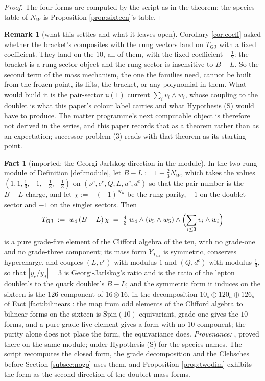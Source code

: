 \documentclass[11pt]{article}
\theoremstyle{definition}
\newtheorem{remark}[theorem]{Remark}
\newtheorem{fact}[theorem]{Fact}
\newcommand{\uu}{\mathfrak{u}}
\begin{document}
\begin{proof}
The four forms are computed by the script as in the theorem; the species table of $N_{W}$ is Proposition \ref{prop:sixteen}'s table.
\end{proof}

\begin{remark}[what this settles and what it leaves open]\label{rem:bracket}
Corollary \ref{cor:coeff} asked whether the bracket's composites with the rung vectors land on $T_{\mathrm{GJ}}$ with a fixed coefficient. They land on the $10$, all of them, with the fixed coefficient $-\tfrac12$: the bracket is a rung-sector object and the rung sector is insensitive to $B - L$. So the second term of the mass mechanism, the one the families need, cannot be built from the frozen point, its lifts, the bracket, or any polynomial in them. What would build it is the pair-sector $\uu(1)$ current $\sum_{i} v_{i} \wedge w_{i}$, whose coupling to the doublet is what this paper's colour label carries and what Hypothesis (S) would have to produce. The matter programme's next computable object is therefore not derived in the series, and this paper records that as a theorem rather than as an expectation; successor problem (3) reads with that theorem as its starting point.
\end{remark}

\begin{fact}[imported: the Georgi-Jarlskog direction in the module]\label{fact:gj}
In the two-rung module of Definition \ref{def:module}, let $B - L := 1 - \tfrac23 N_{W}$, which takes the values $(1, 1, \tfrac13, -1, -\tfrac13, -\tfrac13)$ on $(\nu^{c}, e^{c}, Q, L, u^{c}, d^{c})$ so that the pair number is the $B - L$ charge, and let $\chi := -(-1)^{N_{R}}$ be the rung parity, $+1$ on the doublet sector and $-1$ on the singlet sectors. Then
\[
T_{\mathrm{GJ}} \;:=\; w_{4}\,(B - L)\,\chi \;=\; \tfrac43\; w_{4}\wedge (v_{5}\wedge w_{5}) \wedge \Bigl(\sum_{i\le 3} v_{i}\wedge w_{i}\Bigr)
\]
is a pure grade-five element of the Clifford algebra of the ten, with no grade-one and no grade-three component; its mass form $Y_{T_{\mathrm{GJ}}}$ is symmetric, conserves hypercharge, and couples $(L, e^{c})$ with modulus $1$ and $(Q, d^{c})$ with modulus $\tfrac13$, so that $|y_{e}/y_{d}| = 3$ is Georgi-Jarlskog's ratio and is the ratio of the lepton doublet's to the quark doublet's $B - L$; and the symmetric form it induces on the sixteen is the $126$ component of $16 \otimes 16$, in the decomposition $10_{s} \oplus 120_{a} \oplus 126_{s}$ of Fact \ref{fact:bilinears}: the map from odd elements of the Clifford algebra to bilinear forms on the sixteen is $\mathrm{Spin}(10)$-equivariant, grade one gives the $10$ forms, and a pure grade-five element gives a form with no $10$ component; the purity alone does not place the form, the equivariance does. \emph{Provenance:} \cite[Prop.~8.1]{ButlerT13}, proved there on the same module; under Hypothesis (S) for the species names. The script recomputes the closed form, the grade decomposition and the Clebsches before Section \ref{subsec:nogo} uses them, and Proposition \ref{prop:twodim} exhibits the form as the second direction of the doublet mass forms.
\end{fact}
\end{document}
